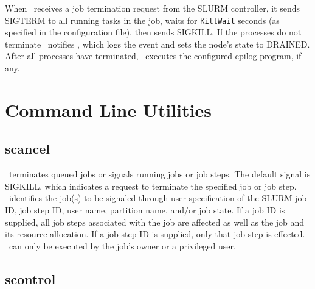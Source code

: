 \documentclass[10pt,onecolumn,times]{../common/llncs}
\begin{document}
{When \slurmd\ receives a job termination request from the SLURM
controller, it sends SIGTERM to all running tasks in the job,
waits for {\tt KillWait} seconds (as specified in the configuration
file), then sends SIGKILL. If the processes do not terminate \slurmd\
notifies \slurmctld , which logs the event and sets the node's state
to DRAINED. After all processes have terminated, \slurmd\ executes the
configured epilog program, if any.

\section{Command Line Utilities}

\subsection{scancel}

\scancel\ terminates queued jobs or signals running jobs or job steps.
The default signal is SIGKILL, which indicates a request to terminate
the specified job or job step.  \scancel\ identifies the job(s) to
be signaled through user specification of the SLURM job ID, job step ID,
user name, partition name, and/or job state.  If a job ID is supplied,
all job steps associated with the job are affected as well as the job
and its resource allocation.  If a job step ID is supplied, only that
job step is effected.  \scancel\ can only be executed by the job's owner
or a privileged user.

\subsection{scontrol}

}
\end{document}
